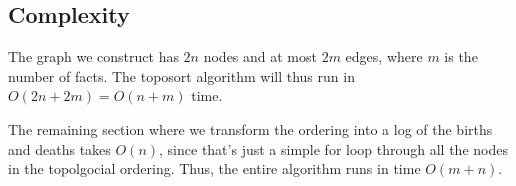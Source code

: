 \documentclass[12pt]{article}
\begin{document}
\subsection{Complexity}

The graph we construct has $2n$ nodes and at most $2m$ edges,
where $m$ is the number of facts.
The toposort algorithm will thus run in $O(2n+2m)=O(n+m)$ time.

The remaining section where we transform the ordering into a
log of the births and deaths takes $O(n)$, since that's just
a simple for loop through all the nodes in the topolgocial ordering.
Thus, the entire algorithm runs in time $O(m+n)$.
\end{document}

